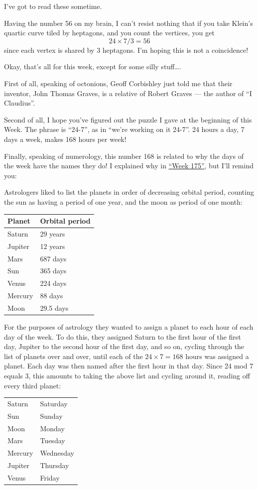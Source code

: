 \documentclass{article}
\begin{document}
I've got to read these sometime.

Having the number 56 on my brain, I can't resist nothing that if you
take Klein's quartic curve tiled by heptagons, and you count the
vertices, you get \[24 \times 7 / 3 = 56\] since each vertex is shared
by 3 heptagons. I'm hoping this is not a coincidence!

Okay, that's all for this week, except for some silly stuff\ldots.

First of all, speaking of octonions, Geoff Corbishley just told me that
their inventor, John Thomas Graves, is a relative of Robert Graves ---
the author of ``I Claudius''.

Second of all, I hope you've figured out the puzzle I gave at the
beginning of this Week. The phrase is ``24-7'', as in ``we're working on
it 24-7''. 24 hours a day, 7 days a week, makes 168 hours per week!

Finally, speaking of numerology, this number 168 is related to why the
days of the week have the names they do! I explained why in
\protect\hyperlink{week175}{``Week 175''}, but I'll remind you:

Astrologers liked to list the planets in order of decreasing orbital
period, counting the sun as having a period of one year, and the moon as
period of one month:

\begin{longtable}[]{@{}ll@{}}
\toprule
Planet & Orbital period\tabularnewline
\midrule
\endhead
Saturn & 29 years\tabularnewline
Jupiter & 12 years\tabularnewline
Mars & 687 days\tabularnewline
Sun & 365 days\tabularnewline
Venus & 224 days\tabularnewline
Mercury & 88 days\tabularnewline
Moon & 29.5 days\tabularnewline
\bottomrule
\end{longtable}

For the purposes of astrology they wanted to assign a planet to each
hour of each day of the week. To do this, they assigned Saturn to the
first hour of the first day, Jupiter to the second hour of the first
day, and so on, cycling through the list of planets over and over, until
each of the \(24 \times 7 = 168\) hours was assigned a planet. Each day
was then named after the first hour in that day. Since 24 mod 7 equals
3, this amounts to taking the above list and cycling around it, reading
off every third planet:

\begin{longtable}[]{@{}ll@{}}
\toprule
\endhead
Saturn & Saturday\tabularnewline
Sun & Sunday\tabularnewline
Moon & Monday\tabularnewline
Mars & Tuesday\tabularnewline
Mercury & Wednesday\tabularnewline
Jupiter & Thursday\tabularnewline
Venus & Friday\tabularnewline
\bottomrule
\end{longtable}
\end{document}
